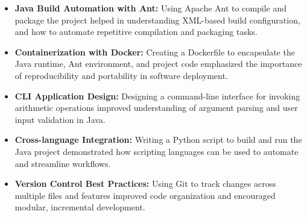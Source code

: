 \documentclass[12pt]{article}
\begin{document}
\begin{itemize}

    \item \textbf{Java Build Automation with Ant:} Using Apache Ant to compile and package the project helped in understanding XML-based build configuration, and how to automate repetitive compilation and packaging tasks.

    \item \textbf{Containerization with Docker:} Creating a Dockerfile to encapsulate the Java runtime, Ant environment, and project code emphasized the importance of reproducibility and portability in software deployment.

    \item \textbf{CLI Application Design:} Designing a command-line interface for invoking arithmetic operations improved understanding of argument parsing and user input validation in Java.

    \item \textbf{Cross-language Integration:} Writing a Python script to build and run the Java project demonstrated how scripting languages can be used to automate and streamline workflows.

    \item \textbf{Version Control Best Practices:} Using Git to track changes across multiple files and features improved code organization and encouraged modular, incremental development.

\end{itemize}
\end{document}
